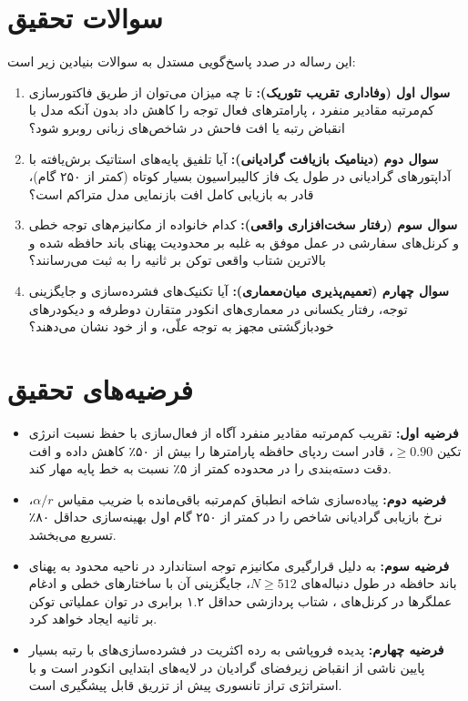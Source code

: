 \documentclass[12pt,a4paper]{report}
\theoremstyle{definition}
\begin{document}
\section{سوالات تحقیق}
این رساله در صدد پاسخ‌گویی مستدل به سوالات بنیادین زیر است:
\begin{enumerate}
    \item \textbf{سوال اول (وفاداری تقریب تئوریک):} تا چه میزان می‌توان از طریق فاکتورسازی کم‌مرتبه مقادیر منفرد ، پارامترهای فعال توجه را کاهش داد بدون آنکه مدل با انقباض رتبه یا افت فاحش در شاخص‌های زبانی روبرو شود؟
    \item \textbf{سوال دوم (دینامیک بازیافت گرادیانی):} آیا تلفیق پایه‌های استاتیک برش‌یافته با آداپتورهای گرادیانی  در طول یک فاز کالیبراسیون بسیار کوتاه (کمتر از ۲۵۰ گام)، قادر به بازیابی کامل افت بازنمایی مدل متراکم است؟
    \item \textbf{سوال سوم (رفتار سخت‌افزاری واقعی):} کدام خانواده از مکانیزم‌های توجه خطی و کرنل‌های سفارشی  در عمل موفق به غلبه بر محدودیت پهنای باند حافظه شده و بالاترین شتاب واقعی توکن بر ثانیه را به ثبت می‌رسانند؟
    \item \textbf{سوال چهارم (تعمیم‌پذیری میان‌معماری):} آیا تکنیک‌های فشرده‌سازی و جایگزینی توجه، رفتار یکسانی در معماری‌های انکودر متقارن دوطرفه و دیکودرهای خودبازگشتی مجهز به توجه علّی،  و  از خود نشان می‌دهند؟
\end{enumerate}

\section{فرضیه‌های تحقیق}
\begin{itemize}
    \item \textbf{فرضیه اول:} تقریب کم‌مرتبه مقادیر منفرد آگاه از فعال‌سازی با حفظ نسبت انرژی تکین $\ge 0.90$، قادر است ردپای حافظه پارامترها را بیش از ۵۰٪ کاهش داده و افت دقت دسته‌بندی را در محدوده کمتر از ۵٪ نسبت به خط پایه مهار کند.
    \item \textbf{فرضیه دوم:} پیاده‌سازی شاخه انطباق کم‌مرتبه باقی‌مانده  با ضریب مقیاس $\alpha/r$، نرخ بازیابی گرادیانی شاخص  را در کمتر از ۲۵۰ گام اول بهینه‌سازی حداقل ۸۰٪ تسریع می‌بخشد.
    \item \textbf{فرضیه سوم:} به دلیل قرارگیری مکانیزم توجه استاندارد در ناحیه محدود به پهنای باند حافظه  در طول دنباله‌های $N \ge 512$، جایگزینی آن با ساختارهای خطی و ادغام عملگرها در کرنل‌های ، شتاب پردازشی حداقل ۱.۲ برابری در توان عملیاتی توکن بر ثانیه ایجاد خواهد کرد.
    \item \textbf{فرضیه چهارم:} پدیده فروپاشی به رده اکثریت  در فشرده‌سازی‌های با رتبه بسیار پایین ناشی از انقباض زیرفضای گرادیان در لایه‌های ابتدایی انکودر است و با استراتژی تراز تانسوری پیش از تزریق قابل پیشگیری است.
\end{itemize}
\end{document}
